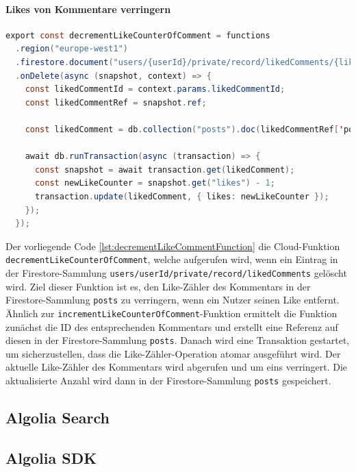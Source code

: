 \paragraph{Likes von Kommentare verringern}

\begin{lstlisting}[language=Java,caption=decrementLikeCounterOfComment Funktion,label=lst:decrementLikeCommentFunction]
  export const decrementLikeCounterOfComment = functions
  .region("europe-west1")
  .firestore.document("users/{userId}/private/record/likedComments/{likedCommentId}")
  .onDelete(async (snapshot, context) => {
    const likedCommentId = context.params.likedCommentId;
    const likedCommentRef = snapshot.ref;

    const likedComment = db.collection("posts").doc(likedCommentRef['post']).collection('comments').doc(likedCommentId);

    await db.runTransaction(async (transaction) => {
      const snapshot = await transaction.get(likedComment);
      const newLikeCounter = snapshot.get("likes") - 1;
      transaction.update(likedComment, { likes: newLikeCounter });
    });
  });
\end{lstlisting}

Der vorliegende Code \ref{lst:decrementLikeCommentFunction} die Cloud-Funktion \texttt{decrementLikeCounterOfComment}, welche aufgerufen wird, wenn ein Eintrag in der Firestore-Sammlung \texttt{users/{userId}/private/record/likedComments} gelöscht wird. Ziel dieser Funktion ist es, den Like-Zähler des Kommentars in der Firestore-Sammlung \texttt{posts} zu verringern, wenn ein Nutzer seinen Like entfernt. Ähnlich zur \texttt{incrementLikeCounterOfComment}-Funktion ermittelt die Funktion zunächst die ID des entsprechenden Kommentars und erstellt eine Referenz auf diesen in der Firestore-Sammlung \texttt{posts}. Danach wird eine Transaktion gestartet, um sicherzustellen, dass die Like-Zähler-Operation atomar ausgeführt wird. Der aktuelle Like-Zähler des Kommentars wird abgerufen und um eins verringert. Die aktualisierte Anzahl wird dann in der Firestore-Sammlung \texttt{posts} gespeichert.

\subsection{Algolia Search}
\subsection{Algolia SDK}

